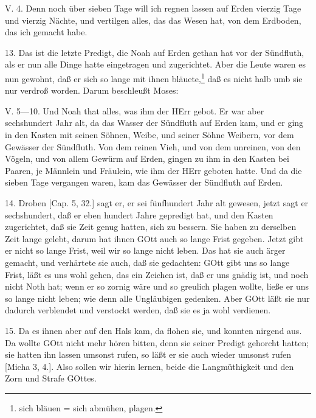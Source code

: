 \begin{schriftzitat}
V. 4. Denn noch über sieben Tage will ich regnen lassen auf Erden vierzig Tage und vierzig Nächte, und vertilgen alles, das das Wesen hat, von dem Erdboden, das ich gemacht habe.
\end{schriftzitat}

13. Das ist die letzte Predigt, die Noah auf Erden gethan hat vor der Sündfluth, als er nun alle Dinge hatte eingetragen und zugerichtet. Aber die Leute waren es nun gewohnt, daß er sich so lange mit ihnen bläuete,\footnote{sich bläuen = sich abmühen, plagen.} daß es nicht halb umb sie nur verdroß worden. Darum beschleußt Moses:

\begin{schriftzitat}
V. 5—10. Und Noah that alles, was ihm der HErr gebot. Er war aber sechshundert Jahr alt, da das Wasser der Sündfluth auf Erden kam, und er ging in den Kasten mit seinen Söhnen, Weibe, und seiner Söhne Weibern, vor dem Gewässer der Sündfluth. Von dem reinen Vieh, und von dem unreinen, von den Vögeln, und von allem Gewürm auf Erden, gingen zu ihm in den Kasten bei Paaren, je Männlein und Fräulein, wie ihm der HErr geboten hatte. Und da die sieben Tage vergangen waren, kam das Gewässer der Sündfluth auf Erden.
\end{schriftzitat}

14. Droben [Cap. 5, 32.] sagt er, er sei fünfhundert Jahr alt gewesen, jetzt sagt er sechshundert, daß er eben hundert Jahre gepredigt hat, und den Kasten zugerichtet, daß sie Zeit genug hatten, sich zu bessern. Sie haben zu derselben Zeit lange gelebt, darum hat ihnen GOtt auch so lange Frist gegeben. Jetzt gibt er nicht so lange Frist, weil wir so lange nicht leben. Das hat sie auch ärger gemacht, und verhärtete sie auch, daß sie gedachten: GOtt gibt uns so lange Frist, läßt es uns wohl gehen, das ein Zeichen ist, daß er uns gnädig ist, und noch nicht Noth hat; wenn er so zornig wäre und so greulich plagen wollte, ließe er uns so lange nicht leben; wie denn alle Ungläubigen gedenken. Aber GOtt läßt sie nur dadurch verblendet und verstockt werden, daß sie es ja wohl verdienen.

15. Da es ihnen aber auf den Hals kam, da flohen sie, und konnten nirgend aus. Da wollte GOtt nicht mehr hören bitten, denn sie seiner Predigt gehorcht hatten; sie hatten ihn lassen umsonst rufen, so läßt er sie auch wieder umsonst rufen [Micha 3, 4.]. Also sollen wir hierin lernen, beide die Langmüthigkeit und den Zorn und Strafe GOttes.

